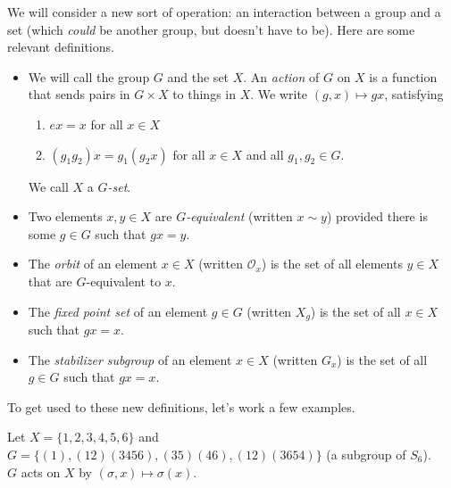 \documentclass[11pt]{exam}
\begin{document}
We will consider a new sort of operation: an interaction between a group and a set (which {\em could} be another group, but doesn't have to be).  Here are some relevant definitions.

\begin{itemize}

\item We will call the group $G$ and the set $X$.  An {\em action} of $G$ on $X$ is a function that sends pairs in $G \times X$ to things in $X$.  We write $(g,x) \mapsto gx$, satisfying
\begin{enumerate}
\item $ex = x$ for all $x \in X$
\item $(g_1g_2)x = g_1(g_2x)$ for all $x \in X$ and all $g_1, g_2\in G$.
\end{enumerate}
We call $X$ a {\em $G$-set}.

\item Two elements $x, y \in X$ are {\em $G$-equivalent} (written $x \sim y$) provided there is some $g \in G$ such that $gx = y$.

\item The {\em orbit} of an element $x \in X$ (written $\mathcal{O}_x$) is the set of all elements $y \in X$ that are $G$-equivalent to $x$.

\item The {\em fixed point set} of an element $g \in G$ (written $X_g$) is the set of all $x \in X$ such that $gx = x$.

\item The {\em stabilizer subgroup} of an element $x \in X$ (written $G_x$) is the set of all $g \in G$ such that $gx = x$.
\end{itemize}

To get used to these new definitions, let's work a few examples.

\begin{questions}
\question Let $X = \{1,2,3,4,5,6\}$ and $G = \{(1), (12)(3456), (35)(46), (12)(3654)\}$ (a subgroup of $S_6$).\\  $G$ acts on $X$ by $(\sigma,x) \mapsto \sigma(x)$. 


\end{questions}
\end{document}
